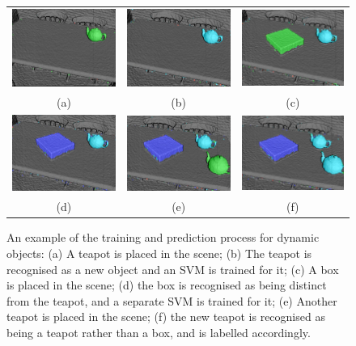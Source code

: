 \begin{figure}[ht]
  \label{fig:moseg_recognition}
  \centering
  \begin{tabular}{ccc}
    \includegraphics[width=.28\linewidth]{figures/moseg/objects1.png} &
    \includegraphics[width=.28\linewidth]{figures/moseg/objects2.png} &
    \includegraphics[width=.28\linewidth]{figures/moseg/objects3.png} \\ 
    (a) & (b) & (c) \\
    \includegraphics[width=.28\linewidth]{figures/moseg/objects4.png} &
    \includegraphics[width=.28\linewidth]{figures/moseg/objects5.png} &
    \includegraphics[width=.28\linewidth]{figures/moseg/objects6.png} \\ 
    (d) & (e) & (f) \\
  \end{tabular}
  \caption[Motion Segmentation Object Recognition]
  {An example of the training and prediction process for dynamic
    objects:
    (a) A teapot is placed in the scene;
    (b) The teapot is recognised as a new object and an SVM is trained for it;
    (c) A box is placed in the scene; (d) the box is recognised as being
    distinct from the teapot, and a separate SVM is trained for it;
    (e) Another teapot is placed in the scene; (f) the new teapot is recognised
    as being a teapot rather than a box, and is labelled accordingly.}
\end{figure}